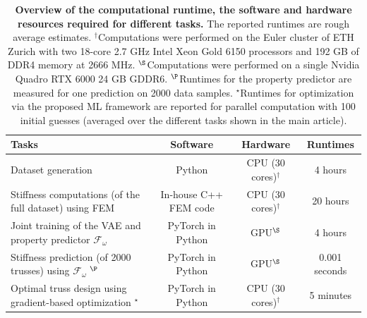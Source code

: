 \documentclass[fleqn,10pt]{wlscirep}
\begin{document}
\begin{table}[ht]
\centering
\begin{tabular}[t]{lccc}
\toprule
\small Tasks & \small Software & \small Hardware & \small Runtimes\\
\midrule
\small Dataset generation& \small Python&\small CPU (30 cores)$^\dagger$& \small 4 hours\\
\small Stiffness computations (of the full dataset) using FEM & \small In-house C++ FEM code & \small CPU (30 cores)$^\dagger$&\small 20 hours\\
\small Joint training of the VAE and property predictor $\mathcal{F}_{\omega}$ & \small PyTorch in Python & \small GPU$^\S$&\small 4 hours\\
\small Stiffness prediction (of 2000 trusses) using $\mathcal{F}_{\omega}$ $^\P$& \small PyTorch in Python &\small  GPU$^\S$& \small 0.001 seconds\\
\small Optimal truss design using gradient-based optimization $^\star$ & \small PyTorch in Python & \small CPU (30 cores)$^\dagger$ & \small  5 minutes\\
\bottomrule
\end{tabular}
\caption{\textbf{Overview of the computational runtime, the software and hardware resources required for different tasks.} The reported runtimes are rough average estimates. $^\dagger$Computations were performed on the Euler \MakeUppercase{} cluster of ETH Zurich with two 18-core 2.7 GHz Intel Xeon Gold 6150 processors and 192 GB of DDR4 memory at 2666 MHz. $^\S$Computations were performed on a single Nvidia Quadro RTX 6000 24 GB GDDR6. $^\P$Runtimes for the property predictor are measured for one prediction on 2000 data samples. $^\star$Runtimes for optimization via the proposed ML framework are reported for parallel computation with 100 initial guesses (averaged over the different tasks shown in the main article).}
\label{tab:SI_runtime}
\end{table}%


\newpage
\appendix
\end{document}
